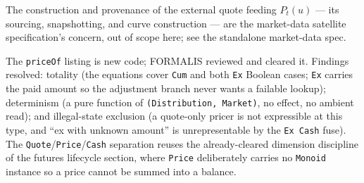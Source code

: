 The construction and provenance of the external quote feeding $P_t(u)$ --- its sourcing, snapshotting, and curve construction --- are the market-data satellite specification's concern, out of scope here; see the standalone market-data spec.

\begin{remark}
The \lstinline|priceOf| listing is new code; FORMALIS reviewed and cleared it. Findings resolved: totality (the equations cover \lstinline|Cum| and both \lstinline|Ex| Boolean cases; \lstinline|Ex| carries the paid amount so the adjustment branch never wants a failable lookup); determinism (a pure function of \lstinline|(Distribution, Market)|, no effect, no ambient read); and illegal-state exclusion (a quote-only pricer is not expressible at this type, and ``ex with unknown amount'' is unrepresentable by the \lstinline|Ex Cash| fuse). The \lstinline|Quote|/\lstinline|Price|/\lstinline|Cash| separation reuses the already-cleared dimension discipline of the futures lifecycle section, where \lstinline|Price| deliberately carries no \lstinline|Monoid| instance so a price cannot be summed into a balance.
\end{remark}
